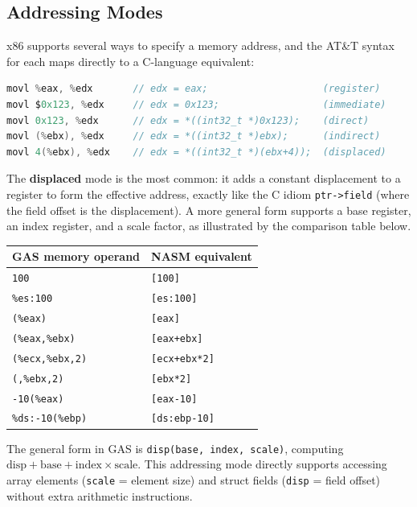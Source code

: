 \documentclass[11pt]{article}
\begin{document}
\subsection{Addressing Modes}

x86 supports several ways to specify a memory address, and the AT\&T syntax for each maps
directly to a C-language equivalent:

\begin{lstlisting}[language=C, caption={AT\&T addressing modes with C-equivalent comments}]
movl %eax, %edx       // edx = eax;                    (register)
movl $0x123, %edx     // edx = 0x123;                  (immediate)
movl 0x123, %edx      // edx = *((int32_t *)0x123);    (direct)
movl (%ebx), %edx     // edx = *((int32_t *)ebx);      (indirect)
movl 4(%ebx), %edx    // edx = *((int32_t *)(ebx+4));  (displaced)
\end{lstlisting}

The \textbf{displaced} mode is the most common: it adds a constant displacement to a
register to form the effective address, exactly like the C idiom \texttt{ptr->field} (where
the field offset is the displacement). A more general form supports a base register, an
index register, and a scale factor, as illustrated by the comparison table below.

\begin{center}
\begin{tabular}{ll}
\toprule
\textbf{GAS memory operand} & \textbf{NASM equivalent} \\
\midrule
\texttt{100}                 & \texttt{[100]} \\
\texttt{\%es:100}            & \texttt{[es:100]} \\
\texttt{(\%eax)}             & \texttt{[eax]} \\
\texttt{(\%eax,\%ebx)}       & \texttt{[eax+ebx]} \\
\texttt{(\%ecx,\%ebx,2)}     & \texttt{[ecx+ebx*2]} \\
\texttt{(,\%ebx,2)}          & \texttt{[ebx*2]} \\
\texttt{-10(\%eax)}          & \texttt{[eax-10]} \\
\texttt{\%ds:-10(\%ebp)}     & \texttt{[ds:ebp-10]} \\
\bottomrule
\end{tabular}
\end{center}

The general form in GAS is \texttt{disp(base, index, scale)}, computing
$\text{disp} + \text{base} + \text{index} \times \text{scale}$. This addressing mode directly
supports accessing array elements (\texttt{scale} = element size) and struct fields
(\texttt{disp} = field offset) without extra arithmetic instructions.
\end{document}
